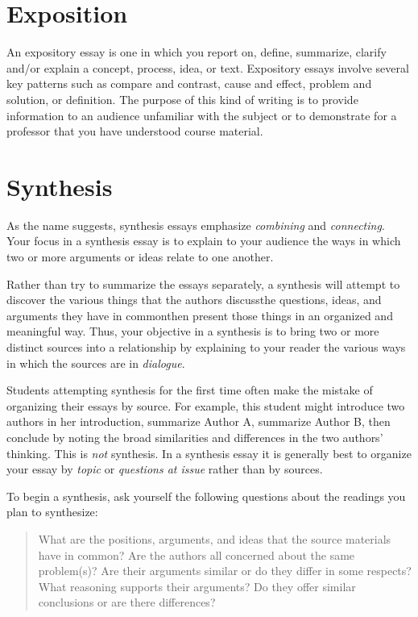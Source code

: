 \section{Exposition} An expository essay is one in which you report on, define,
summarize, clarify and/or explain a concept, process, idea, or text. Expository
essays involve several key patterns such as compare and contrast, cause and
effect, problem and solution, or definition. The purpose of this kind of
writing is to provide information to an audience unfamiliar with the subject or
to demonstrate for a professor that you have understood course material.

\hypertarget{synthesisessay}{} \section{Synthesis}

As the name suggests, synthesis essays emphasize \emph{combining} and
\emph{connecting}. Your focus in a synthesis essay is to explain to your
audience the ways in which two or more arguments or ideas relate to one another.

Rather than try to summarize
the essays separately, a synthesis will attempt to discover the various things
that the authors discuss\textemdash the questions, ideas, and arguments they
have in common\textemdash then present those things in an organized and
meaningful way. Thus, your objective in a synthesis is to bring two or more
distinct sources into a relationship by explaining to your reader the various
ways in which the sources are in \emph{dialogue}.

Students attempting synthesis for the first time often make the mistake of
organizing their essays by source. For example, this student might introduce two
authors in her introduction, summarize Author A, summarize Author B, then
conclude by noting the broad similarities and differences in the two authors'
thinking. This is \emph{not} synthesis. In a synthesis essay it is generally best to organize your essay by \emph{topic} or \emph{questions at issue} rather than by sources. 

To begin a synthesis, ask yourself the following questions about the readings
you plan to synthesize: \begin{quote} What are the positions, arguments, and
ideas that the source materials have in common? Are the authors all concerned
about the same problem(s)?  Are their arguments similar or do they differ in some respects? What
reasoning supports their arguments? Do they offer similar conclusions or are
there differences? \end{quote}

